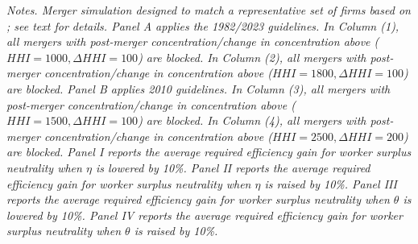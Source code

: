 \documentclass[12pt]{article}
\theoremstyle{prop}
\begin{document}
\begin{table}[p!]
	\centering
	\resizebox{\textwidth}{!}{}
	\caption{Required efficiency gains. \label{tab:merger_guidelines_reg_eta_theta_robust}}
	\begin{footnotesize}
		\begin{flushleft}
		 \textit{Notes.  Merger simulation designed to match a representative set of firms based on \citet{Arnold}; see text for details. Panel A applies the 1982/2023 guidelines. In Column (1), all mergers with post-merger concentration/change in concentration above ($HHI=1000, \Delta HHI=100$) are blocked.  In Column (2), all mergers with post-merger concentration/change in concentration above ($HHI=1800, \Delta HHI=100$) are blocked. Panel B applies 2010 guidelines. In Column (3), all mergers with post-merger concentration/change in concentration above ($HHI=1500, \Delta HHI=100$) are blocked.  In Column (4), all mergers with post-merger concentration/change in concentration above ($HHI=2500, \Delta HHI=200$) are blocked. Panel I  reports the average required efficiency gain for worker surplus neutrality when $\eta$ is lowered by 10\%.   Panel II  reports the average required efficiency gain for worker surplus neutrality when $\eta$ is raised by 10\%.  Panel III  reports the average required efficiency gain for worker surplus neutrality when $\theta$ is lowered by 10\%.   Panel IV  reports the average required efficiency gain for worker surplus neutrality when $\theta$ is raised by 10\%.}   
		\end{flushleft}
	\end{footnotesize}
\end{table}

\clearpage
\appendix

%
\end{document}
